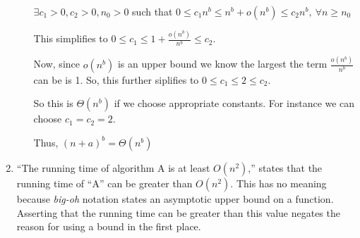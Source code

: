 \documentclass[12pt,letterpaper]{article}
\begin{document}
\begin{enumerate}
\begin{enumerate}
          $\exists c_1 > 0, c_2 > 0, n_0 > 0$ such that $0 \le c_1n^b \le n^b + o(n^b) \le c_2n^b, \ \forall n \ge n_0$

          This simplifies to $0 \le c_1 \le 1 + \frac{o(n^b)}{n^b} \le c_2$.

          Now, since $o(n^b)$ is an upper bound we know the largest the term $\frac{o(n^b)}{n^b}$ can be is 1.
          So, this further siplifies to $0 \le c_1 \le 2 \le c_2$.

          So this is $\Theta(n^b)$ if we choose appropriate constants.
          For instance we can choose $c_1 = c_2 = 2$.

          Thus, $(n + a)^b = \Theta(n^b)$
      \end{enumerate}

    \item
      ``The running time of algorithm A is at least $O(n^2)$,'' states that the running time of ``A'' can be greater than $O(n^2)$.
      This has no meaning because \textit{big-oh} notation states an asymptotic upper bound on a function.
      Asserting that the running time can be greater than this value negates the reason for using a bound in the first place.
  \end{enumerate}
\end{document}
